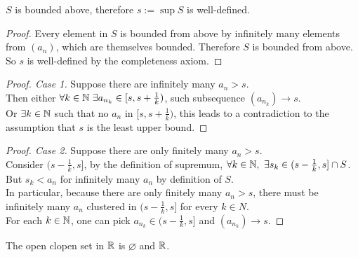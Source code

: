 \documentclass[11pt]{article}
\begin{document}
 	\begin{lemma}
 		$S$ is bounded above, therefore $s := \sup S$ is well-defined.
 	\end{lemma}
 	\begin{proof}
 		Every element in $S$ is bounded from above by infinitely many elements from $(a_n)$, which are themselves bounded. Therefore $S$ is bounded from above. \\
 		So $s$ is well-defined by the completeness axiom.
 	\end{proof}
 	
 	\begin{proof}[Proof. Case 1]
 		Suppose there are infinitely many $a_n > s$. \\
 		Then either $\forall k \in \mathbb{N}\ \exists a_{n_k} \in [s, s + \frac{1}{k})$, such subsequence $(a_{n_k}) \to s$. \\
 		Or $\exists k \in \mathbb{N}$ such that no $a_n$ in $[s, s + \frac{1}{k})$, this leads to a contradiction to the assumption that $s$ is the least upper bound.
 	\end{proof}
 	
 	\begin{proof}[Proof. Case 2]
 		Suppose there are only finitely many $a_n > s$. \\
 		Consider $(s - \frac{1}{k}, s]$, by the definition of supremum, $\forall k \in \mathbb{N},\ \exists s_k \in (s - \frac{1}{k}, s] \cap S$. \\
 		But $s_k < a_n$ for infinitely many $a_n$ by definition of $S$. \\
 		In particular, because there are only finitely many $a_n > s$, there must be infinitely many $a_n$ clustered in $(s - \frac{1}{k}, s]$ for every $k \in N$.\\
 		For each $k \in \mathbb{N}$, one can pick $a_{n_k} \in (s - \frac{1}{k}, s]$ and $(a_{n_k}) \to s$.
 	\end{proof}
 	
 	\begin{proposition}
 		The open clopen set in $\mathbb{R}$ is $\varnothing$ and $\mathbb{R}$.
 	\end{proposition}
 	
\end{document}
